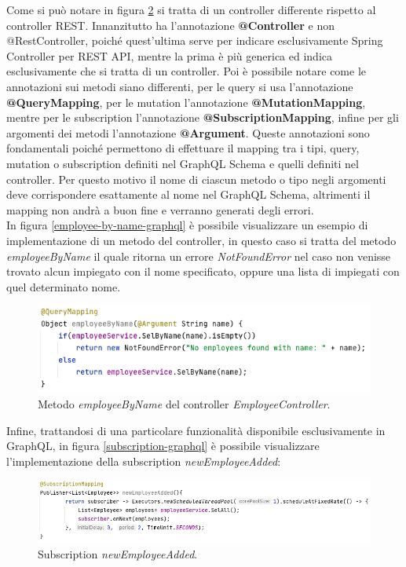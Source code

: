 \FloatBarrier
Come si può notare in figura \ref{graphql-controller} si tratta di un controller differente rispetto al controller REST. Innanzitutto ha l'annotazione \textbf{@Controller} e non @RestController, poiché quest'ultima serve per indicare esclusivamente Spring Controller per REST API, mentre la prima è più generica ed indica esclusivamente che si tratta di un controller. Poi è possibile notare come le annotazioni sui metodi siano differenti, per le query si usa l'annotazione \textbf{@QueryMapping}, per le mutation l'annotazione \textbf{@MutationMapping}, mentre per le subscription l'annotazione \textbf{@SubscriptionMapping}, infine per gli argomenti dei metodi l'annotazione \textbf{@Argument}. Queste annotazioni sono fondamentali poiché permettono di effettuare il mapping tra i tipi, query, mutation o subscription definiti nel GraphQL Schema e quelli definiti nel controller. Per questo motivo il nome di ciascun metodo o tipo negli argomenti deve corrispondere esattamente al nome nel GraphQL Schema, altrimenti il mapping non andrà a buon fine e verranno generati degli errori.\\
In figura \ref{employee-by-name-graphql} è possibile visualizzare un esempio di implementazione di un metodo del controller, in questo caso si tratta del metodo \textit{employeeByName} il quale ritorna un errore \textit{NotFoundError} nel caso non venisse trovato alcun impiegato con il nome specificato, oppure una lista di impiegati con quel determinato nome.
\FloatBarrier
\begin{figure}[!ht]
\centering
\includegraphics[width=0.8\linewidth]{immagini/employeeByNameGraphQL.png}
\caption{Metodo \textit{employeeByName} del controller \textit{EmployeeController}.}
\label{graphql-controller}
\end{figure}
\FloatBarrier
Infine, trattandosi di una particolare funzionalità disponibile esclusivamente in GraphQL, in figura \ref{subscription-graphql} è possibile visualizzare l'implementazione della subscription \textit{newEmployeeAdded}:
\FloatBarrier
\begin{figure}[!ht]
\centering
\includegraphics[width=0.8\linewidth]{immagini/newEmployeeAdded.png}
\caption{Subscription \textit{newEmployeeAdded}.}
\label{graphql-controller}
\end{figure}
